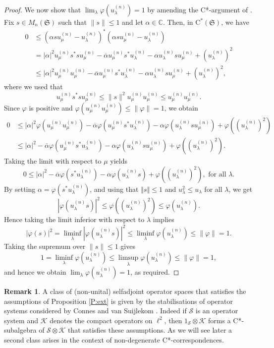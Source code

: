 \documentclass[11pt, draft]{amsart}
\numberwithin{equation}{section}
\theoremstyle{plain}
\theoremstyle{definition}
\newtheorem{remark}[theorem]{Remark}
\theoremstyle{remark}
\newcommand{\K}{{\mathcal{K}}}
\renewcommand{\S}{{\mathcal{S}}}
\def\al{\alpha}
\def\la{\lambda}
\newcommand\vphi{\varphi}
\newcommand{\bC}{\mathbb{C}}
\newcommand{\fS}{{\mathfrak{S}}}
\newcommand{\foral}{\text{ for all }}
\newcommand{\ca}{\mathrm{C}^*}
\newcommand{\ol}{\overline}
\newcommand{\nor}[1]{\left\Vert #1\right\Vert} %
\begin{document}
\begin{proof}
We now show that $\lim_\la \vphi(u_\la^{(n)})=1$ by amending the C*-argument of \cite[Theorem 3.3.3]{Mur90}.
Fix $s\in M_n(\fS)$ such that $\|s\|\leq 1$ and let $\al \in \bC$. 
Then, in $\ca(\fS)$, we have
\begin{align*}
0 
& \leq
(\al s u_{\mu}^{(n)}-u_\la^{(n)})^* (\al s u_{\mu}^{(n)}-u_\la^{(n)}) \\
& =
|\al|^2 u_\mu^{(n)} s^*su_\mu^{(n)}-\ol{\al}u_\mu^{(n)} s^* u_\la^{(n)}-\al u_\la^{(n)} s u_\mu^{(n)} +(u_\la^{(n)})^2\\
& \leq 
|\al|^2 u_\mu^{(n)} u_\mu^{(n)}-\ol{\al}u_\mu^{(n)} s^* u_\la^{(n)}-\al u_\la^{(n)} s u_\mu^{(n)} +(u_\la^{(n)})^2,
\end{align*}
where we used that
\[
u_\mu^{(n)} s^*su_\mu^{(n)} \leq \|s\|^2 u_\mu^{(n)} u_\mu^{(n)} \leq u_\mu^{(n)} u_\mu^{(n)}.
\]
Since $\vphi$ is positive and $\vphi(u_\mu^{(n)} u_\mu^{(n)}) \leq \|\vphi\|=1$, we obtain
\begin{align*}
0
& \leq 
|\al|^2 \vphi(u_\mu^{(n)} u_\mu^{(n)})-\ol{\al}\vphi(u_\mu^{(n)} s^* u_\la^{(n)})-\al \vphi(u_\la^{(n)} s u_\mu^{(n)}) + \vphi((u_\la^{(n)})^2)\\
& \leq
|\al|^2-\ol{\al}\vphi(u_\mu^{(n)} s^* u_\la^{(n)})-\al \vphi(u_\la^{(n)} s u_\mu^{(n)}) + \vphi((u_\la^{(n)})^2).
\end{align*}
Taking the limit with respect to $\mu$ yields
\[
0 \leq |\al|^2-\ol{\al}\vphi(s^* u_\la^{(n)})-\al \vphi(u_\la^{(n)} s ) + \vphi((u_\la^{(n)})^2), \foral \la.
\]
By setting $\al = \vphi(s^*u_\la^{(n)})$, and using that $\nor{s} \leq 1$ and $u_\la^2 \leq u_\la$ for all $\la$, we get
\[
|\vphi(u_\la^{(n)} s)|^2
\leq 
\vphi((u_\la^{(n)})^2) \leq \vphi(u_\la^{(n)}).
\]
Hence taking the limit inferior with respect to $\la$ implies 
\[
|\vphi(s)|^2 = \liminf_\la |\vphi(u_\la^{(n)} s)|^2 \leq \liminf_\la \vphi(u_\la^{(n)}) \leq \|\vphi\| = 1.
\] 
Taking the supremum over $\|s\| \leq 1$ gives 
\[
1=\liminf_\la \vphi(u_\la^{(n)})\leq \limsup_\la \vphi(u_\la^{(n)})\leq \|\vphi\|=1,
\]
and hence we obtain $\lim_\la \vphi(u_\la^{(n)})=1$, as required.
\end{proof}

\begin{remark}
A class of (non-unital) selfadjoint operator spaces that satisfies the assumptions of Proposition \ref{P:ext} is given by the stabilisations of operator systems considered by Connes and van Suijlekom \cite{CS21}.
Indeed if $\S$ is an operator system and $\K$ denotes the compact operators on $\ell^2$, then $1_\S \otimes \K$ forms a C*-subalgebra of $\S \otimes \K$ that satisfies these assumptions.
As we will see later a second class arises in the context of non-degenerate C*-correspondences.
\end{remark}
\end{document}

